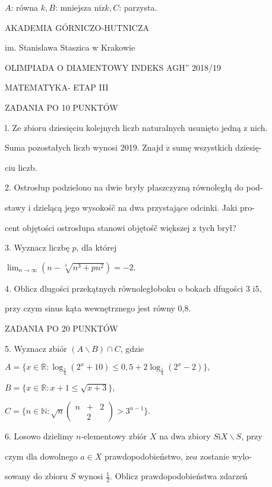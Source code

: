 \documentclass[a4paper,12pt]{article}
\begin{document}
$A$: równa $k, B$: mniejsza $\mathrm{n}\mathrm{i}\dot{\mathrm{z}}k, C$: parzysta.






AKADEMIA GÓRNICZO-HUTNICZA

im. Stanislawa Staszica w Krakowie

OLIMPIADA O DIAMENTOWY INDEKS AGH'' 2018/19

MATEMATYKA- ETAP III

ZADANIA PO 10 PUNKTÓW

l. Ze zbioru dziesięciu kolejnych liczb naturalnych usunięto jedną z nich.

Suma pozostałych liczb wynosi 2019. Znajd $\acute{\mathrm{z}}$ sumę wszystkich dziesię-

ciu liczb.

2. Ostrosłup podzielono na dwie bryły płaszczyzną równoległą do pod-

stawy i dzielącą jego wysokośč na dwa przystające odcinki. Jaki pro-

cent objętości ostrosłupa stanowi objętośč większej z tych brył?

3. Wyznacz liczbę $p$, dla której

$\displaystyle \lim_{n\rightarrow\infty}(n-\sqrt[3]{n^{3}+pn^{2}})=-2.$

4. Oblicz dlugości przekątnych równoległoboku o bokach dfugości 3 $\mathrm{i}5,$

przy czym sinus kąta wewnętrznego jest równy 0,8.

ZADANIA PO 20 PUNKTÓW

5. Wyznacz zbiór $(A\backslash B)\cap C$, gdzie

$A=\{x\in \mathbb{R}:\log_{\frac{1}{4}}(2^{x}+10)\leq 0,5+2\log_{\frac{1}{4}}(2^{x}-2)\},$

$B=\{x\in \mathbb{R}:x+1\leq\sqrt{x+3}\},$

$C=\{n\in \mathbb{N}:\sqrt{n}\left(\begin{array}{lll}
n & + & 2\\
 & 2 & 
\end{array}\right)>3^{n-1}\}.$

6. Losowo dzielimy $n$-elementowy zbiór $X$ na dwa zbiory $S\mathrm{i}X\backslash S$, przy

czym dla dowolnego $a\in X$ prawdopodobieństwo, $\dot{\mathrm{z}}\mathrm{e}a$ zostanie wylo-

sowany do zbioru $S$ wynosi $\displaystyle \frac{1}{2}$. Oblicz prawdopodobieństwa zdarzeń
\end{document}

